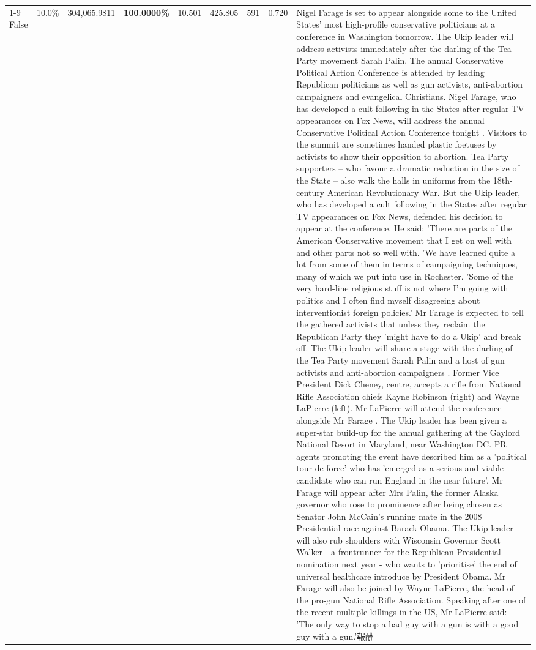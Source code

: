 \begin{table}[H]
\begin{tabular}{lllrlllll}
\cline{1-9}
False & 10.0\% & 304,065.9811 & \bfseries \color{red} 100.0000\% & 10.501 & 425.805 & 591 & 0.720 & Nigel Farage is set to appear alongside some to the United States' most high-profile conservative politicians at a conference in Washington tomorrow. The Ukip leader will address activists immediately after the darling of the Tea Party movement Sarah Palin. The annual Conservative Political Action Conference is attended by leading Republican politicians as well as gun activists, anti-abortion campaigners and evangelical Christians. Nigel Farage, who has developed a cult following in the States after regular TV appearances on Fox News, will address the annual Conservative Political Action Conference tonight . Visitors to the summit are sometimes handed plastic foetuses by activists to show their opposition to abortion. Tea Party supporters – who favour a dramatic reduction in the size of the State – also walk the halls in uniforms from the 18th-century American Revolutionary War. But the Ukip leader, who has developed a cult following in the States after regular TV appearances on Fox News, defended his decision to appear at the conference. He said: 'There are parts of the American Conservative movement that I get on well with and other parts not so well with. 'We have learned quite a lot from some of them in terms of campaigning techniques, many of which we put into use in Rochester. 'Some of the very hard-line religious stuff is not where I'm going with politics and I often find myself disagreeing about interventionist foreign policies.' Mr Farage is expected to tell the gathered activists that unless they reclaim the Republican Party they 'might have to do a Ukip' and break off. The Ukip leader will share a stage with the darling of the Tea Party movement Sarah Palin and a host of gun activists and anti-abortion campaigners . Former Vice President Dick Cheney, centre, accepts a rifle from National Rifle Association chiefs Kayne Robinson (right) and Wayne LaPierre (left). Mr LaPierre will attend the conference alongside Mr Farage . The Ukip leader has been given a super-star build-up for the annual gathering at the Gaylord National Resort in Maryland, near Washington DC. PR agents promoting the event have described him as a 'political tour de force' who has 'emerged as a serious and viable candidate who can run England in the near future'. Mr Farage will appear after Mrs Palin, the former Alaska governor who rose to prominence after being chosen as Senator John McCain's running mate in the 2008 Presidential race against Barack Obama. The Ukip leader will also rub shoulders with Wisconsin Governor Scott Walker - a frontrunner for the Republican Presidential nomination next year - who wants to 'prioritise' the end of universal healthcare introduce by President Obama. Mr Farage will also be joined by Wayne LaPierre, the head of the pro-gun National Rifle Association. Speaking after one of the recent multiple killings in the US, Mr LaPierre said: 'The only way to stop a bad guy with a gun is with a good guy with a gun.'報酬 \\

\end{tabular}
\end{table}

